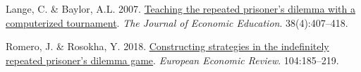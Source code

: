 \documentclass[11pt,preprint]{elsarticle}
\numberwithin{equation}{section}
\numberwithin{figure}{section}
\numberwithin{table}{section}
\newlength{\cslhangindent}
\newenvironment{CSLReferences}[2] %
{\begin{list}{}{%
	\setlength{\itemindent}{0pt}
	\setlength{\leftmargin}{0pt}
	\setlength{\parsep}{0pt}
	\ifodd #1
	\setlength{\leftmargin}{\cslhangindent}
	\setlength{\itemindent}{-1\cslhangindent}
	\fi
	\setlength{\itemsep}{#2\baselineskip}}}
{\end{list}}
\begin{document}
\begin{CSLReferences}{1}{1}
Lange, C. \& Baylor, A.L. 2007.
\href{https://doi.org/10.3200/JECE.38.4.407-418}{Teaching the repeated
prisoner's dilemma with a computerized tournament}. \emph{The Journal of
Economic Education}. 38(4):407--418.

Romero, J. \& Rosokha, Y. 2018.
\href{https://doi.org/10.1016/j.euroecorev.2018.02.008}{Constructing
strategies in the indefinitely repeated prisoner's dilemma game}.
\emph{European Economic Review}. 104:185--219.

\end{CSLReferences}


\end{document}
